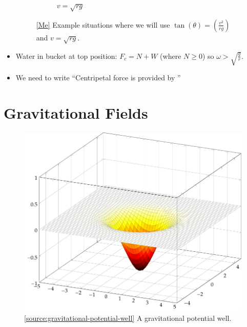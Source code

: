 \documentclass[oneside]{book}
\begin{document}
\begin{itemize}[label=\(\square\)]
\begin{figure}[H]
\begin{subfigure}[c]{0.35\textwidth}
            \vspace{0.5cm}
            \caption{\(v=\sqrt{rg}\)}
        \end{subfigure}%
        \caption{\ref{Me} Example situations where we will use \(\tan(\theta)=\left(\frac{v^2}{rg}\right)\) and \(v=\sqrt{rg}\).}
        \label{table:circular-motion-examples}
    \end{figure}
    \item Water in bucket at top position: \(F_c=N+W\) (where \(N\geq 0\)) so \(\omega>\sqrt{\frac{g}{r}}\).
    \item We need to write ``Centripetal force is provided by \underline{\hspace{1cm}}'' 
\end{itemize}
\chapter{Gravitational Fields}
\begin{figure}[H]
    \centering
    \includegraphics{../images/gravitational-potential-well/gravitational-potential-well-illustration.pdf}
    \caption{\ref{source:gravitational-potential-well} A gravitational potential well.}
    \label{fig:gravitational-potential-well}
\end{figure}
\end{document}
